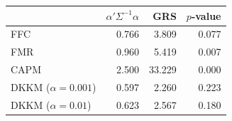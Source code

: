 \begin{tabular}{lrrr}
\toprule
 & $\alpha'\Sigma^{-1}\alpha$ & GRS & $p$-value \\
\midrule
FFC & 0.766 & 3.809 & 0.077 \\
FMR & 0.960 & 5.419 & 0.007 \\
CAPM & 2.500 & 33.229 & 0.000 \\
DKKM ($\alpha=0.001$) & 0.597 & 2.260 & 0.223 \\
DKKM ($\alpha=0.01$) & 0.623 & 2.567 & 0.180 \\
\bottomrule
\end{tabular}
